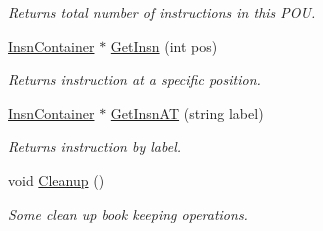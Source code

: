 \begin{DoxyCompactItemize}
\begin{DoxyCompactList}\small\item\em Returns total number of instructions in this P\+OU. \end{DoxyCompactList}\item 
\hyperlink{classpc__emulator_1_1InsnContainer}{Insn\+Container} $\ast$ \hyperlink{classpc__emulator_1_1PoUCodeContainer_ae6ea5405c4fb40b8bf4e4029f3c7b8f1}{Get\+Insn} (int pos)\hypertarget{classpc__emulator_1_1PoUCodeContainer_ae6ea5405c4fb40b8bf4e4029f3c7b8f1}{}\label{classpc__emulator_1_1PoUCodeContainer_ae6ea5405c4fb40b8bf4e4029f3c7b8f1}

\begin{DoxyCompactList}\small\item\em Returns instruction at a specific position. \end{DoxyCompactList}\item 
\hyperlink{classpc__emulator_1_1InsnContainer}{Insn\+Container} $\ast$ \hyperlink{classpc__emulator_1_1PoUCodeContainer_a240929b1da6de6793ce858f424302dd7}{Get\+Insn\+AT} (string label)\hypertarget{classpc__emulator_1_1PoUCodeContainer_a240929b1da6de6793ce858f424302dd7}{}\label{classpc__emulator_1_1PoUCodeContainer_a240929b1da6de6793ce858f424302dd7}

\begin{DoxyCompactList}\small\item\em Returns instruction by label. \end{DoxyCompactList}\item 
void \hyperlink{classpc__emulator_1_1PoUCodeContainer_af0f4209dbbb4cb09e324efe82b938784}{Cleanup} ()\hypertarget{classpc__emulator_1_1PoUCodeContainer_af0f4209dbbb4cb09e324efe82b938784}{}\label{classpc__emulator_1_1PoUCodeContainer_af0f4209dbbb4cb09e324efe82b938784}

\begin{DoxyCompactList}\small\item\em Some clean up book keeping operations. \end{DoxyCompactList}\end{DoxyCompactItemize}
